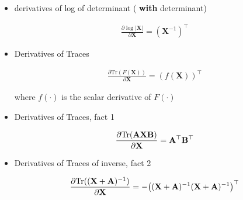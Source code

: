 \documentclass{article}
\def\X{{\mathbf X}}
\def\A{{\mathcal{A}}}
\def\tr{\text{tr}}
\def\X{{\bf X}}
\def\A{{\bf A}}
\def\B{{\bf B}}
\def\tr{\text{Tr}}
\def\X{{\mathbf X}}
\begin{document}
\begin{itemize}

%

%

\item derivatives of log of determinant ({\color{blue} \bf with} determinant)

\begin{equation}
\begin{split}
\frac{\partial \log | \X | }{\partial \X} = (\X^{-1})^\top 
\end{split}
\end{equation}

\item Derivatives of Traces

\begin{equation}
\begin{split}
\frac{\partial \tr(F(\X)) }{\partial \X} = (f(\X))^\top
\end{split}
\end{equation}

\hspace{10 mm} where $f(\cdot)$ is the {\color{red} scalar derivative} of $F(\cdot)$


\item Derivatives of Traces, fact 1

\begin{equation}
\begin{split}
\frac{\partial \tr( {\bf A} \X  {\bf B}  ) }{\partial \X} = \A^\top \B^\top
\end{split}
\end{equation}

\item Derivatives of Traces of inverse, fact 2

\begin{equation}\begin{split}
\frac{\partial \tr( (\X + \A)^{-1} ) }{\partial \X} = - \big(  (\X + \A)^{-1}  (\X + \A)^{-1} \big)^\top
\end{split}\end{equation}



\end{itemize}
\end{document}

